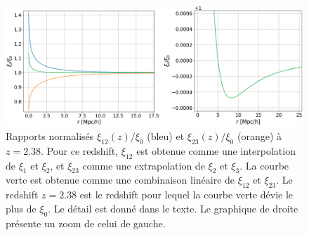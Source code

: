 \begin{figure}
  \centering
  \includegraphics[scale=0.45]{qsolognormal3}
  \caption{Rapports normalisés $\xi_{12}(z) / \xi_0$ (bleu) et $\xi_{23}(z) / \xi_0$ (orange) à $z = \num{2.38}$. Pour ce redshift, $\xi_{12}$ est obtenue comme une interpolation de $\xi_1$ et $\xi_2$, et $\xi_{23}$ comme une extrapolation de $\xi_{2}$ et $\xi_{3}$. La courbe verte est obtenue comme une combinaison linéaire de $\xi_{12}$ et $\xi_{23}$. Le redshift $z = \num{2.38}$ est le redshift pour lequel la courbe verte dévie le plus de $\xi_0$. Le détail est donné dans le texte. Le graphique de droite présente un zoom de celui de gauche.}
  \label{fig:qsolognormal3}
\end{figure}







